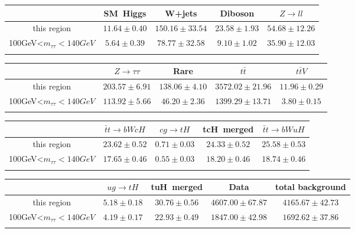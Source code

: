 \centering
\begin{tabular}{ccccc} \toprule\toprule
 & SM~Higgs & W+jets & Diboson & $Z\to ll$\\\midrule
this region & $11.64\pm0.40$ & $150.16\pm33.54$ & $23.58\pm1.93$ & $54.68\pm12.26$\\
100GeV<$m_{\tau\tau}<140GeV$ & $5.64\pm0.39$ & $78.77\pm32.58$ & $9.10\pm1.02$ & $35.90\pm12.03$\\
\bottomrule\bottomrule\\
\end{tabular}
\begin{tabular}{ccccc} \toprule\toprule
 & $Z\to \tau\tau$ & Rare & $t\bar{t}$ & $t\bar{t}V$\\\midrule
this region & $203.57\pm6.91$ & $138.06\pm4.10$ & $3572.02\pm21.96$ & $11.96\pm0.29$\\
100GeV<$m_{\tau\tau}<140GeV$ & $113.92\pm5.66$ & $46.20\pm2.36$ & $1399.29\pm13.71$ & $3.80\pm0.15$\\
\bottomrule\bottomrule\\
\end{tabular}
\begin{tabular}{ccccc} \toprule\toprule
 & $\bar{t}t\to bWcH$ & $cg\to tH$ & tcH~merged & $\bar{t}t\to bWuH$\\\midrule
this region & $23.62\pm0.52$ & $0.71\pm0.03$ & $24.33\pm0.52$ & $25.58\pm0.53$\\
100GeV<$m_{\tau\tau}<140GeV$ & $17.65\pm0.46$ & $0.55\pm0.03$ & $18.20\pm0.46$ & $18.74\pm0.46$\\
\bottomrule\bottomrule\\
\end{tabular}
\begin{tabular}{ccccc} \toprule\toprule
 & $ug\to tH$ & tuH~merged & Data & total background\\\midrule
this region & $5.18\pm0.18$ & $30.76\pm0.56$ & $4607.00\pm67.87$ & $4165.67\pm42.73$\\
100GeV<$m_{\tau\tau}<140GeV$ & $4.19\pm0.17$ & $22.93\pm0.49$ & $1847.00\pm42.98$ & $1692.62\pm37.86$\\
\bottomrule\bottomrule\\
\end{tabular}
